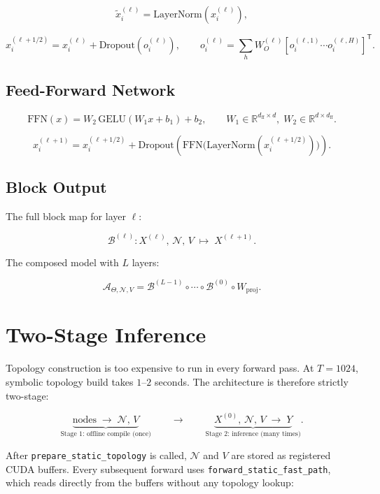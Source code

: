 \documentclass[11pt]{article}
\newcommand{\R}{\mathbb{R}}
\begin{document}
\[
\tilde{x}_i^{(\ell)} = \text{LayerNorm}(x_i^{(\ell)}),
\]

\[
x_i^{(\ell+1/2)}
= x_i^{(\ell)}
+ \text{Dropout}\!\left(o_i^{(\ell)}\right),
\qquad
o_i^{(\ell)} = \sum_h W_O^{(\ell)} [o_i^{(\ell,1)}\cdots o_i^{(\ell,H)}]^{\mathsf{T}}.
\]

\subsection*{Feed-Forward Network}

\[
\text{FFN}(x) = W_2\,\text{GELU}(W_1 x + b_1) + b_2,
\qquad
W_1 \in \R^{d_{\text{ff}} \times d},\;
W_2 \in \R^{d \times d_{\text{ff}}}.
\]

\[
x_i^{(\ell+1)}
= x_i^{(\ell+1/2)}
+ \text{Dropout}\!\left(
    \text{FFN}\bigl(\text{LayerNorm}(x_i^{(\ell+1/2)})\bigr)
  \right).
\]

\subsection*{Block Output}

The full block map for layer $\ell$:

\[
\mathcal{B}^{(\ell)}: X^{(\ell)},\,\mathcal{N},\,V
\;\longmapsto\;
X^{(\ell+1)}.
\]

The composed model with $L$ layers:

\[
\mathcal{A}_{\Theta,\mathcal{N},V}
=
\mathcal{B}^{(L-1)} \circ \cdots \circ \mathcal{B}^{(0)} \circ W_{\text{proj}}.
\]

\section*{Two-Stage Inference}

Topology construction is too expensive to run in every forward pass.
At $T=1024$, symbolic topology build takes $1$--$2$ seconds.
The architecture is therefore strictly two-stage:

\[
\underbrace{
  \text{nodes}
  \;\longrightarrow\;
  \mathcal{N},\, V
}_{\text{Stage 1: offline compile (once)}}
\qquad\longrightarrow\qquad
\underbrace{
  X^{(0)},\,\mathcal{N},\,V
  \;\longrightarrow\;
  Y
}_{\text{Stage 2: inference (many times)}}.
\]

After \texttt{prepare\_static\_topology} is called, $\mathcal{N}$ and $V$
are stored as registered CUDA buffers.  Every subsequent forward uses
\texttt{forward\_static\_fast\_path}, which reads directly from the
buffers without any topology lookup:
\end{document}
